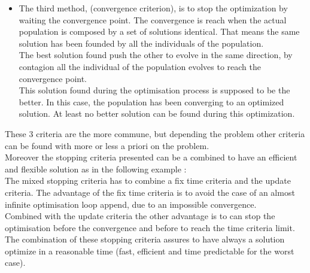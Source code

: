 \begin{itemize}
\item The third method, (convergence criterion), is to stop the optimization by waiting the convergence point. The convergence is reach when the actual population is composed by a set of solutions identical. That means the same solution has been founded by all the individuals of the population. \\
 The best solution found push the other to evolve in the same direction, by contagion all the individual of the population evolves to reach the convergence point. \\ 
 This solution found during the optimisation process is supposed to be the better. In this case, the population has been converging to an optimized solution. At least no better solution can be found during this optimization.\\
\end{itemize}
These 3 criteria are the more commune, but depending the problem other criteria can be found with more or less a priori on the problem.\\

 Moreover the stopping criteria presented can be a combined to have an efficient and flexible solution as  in the following example :\\
The mixed stopping criteria has to combine a fix time criteria and the update criteria.
The advantage of the fix time criteria is to avoid the case of an almost infinite optimisation loop append, due to an impossible convergence.%
\\ %
Combined with the update criteria the other advantage is to can stop the optimisation before the convergence and before to reach the time criteria limit.\\
The combination of these stopping criteria assures to have always a solution optimize in a reasonable time (fast, efficient and time predictable for the worst case). 

 
%



